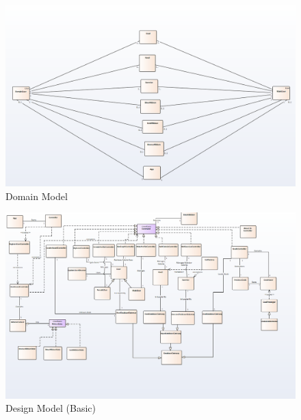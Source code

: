 \documentclass[10pt]{article}
\begin{document}
\begin{figure}[h!]
	\begin{center}
		\includegraphics[width=\columnwidth]{Domain.png}
		\caption{{Domain Model
				{\label{div-291050}}%
		}}
	\end{center}
\end{figure}


\begin{figure}[h!]
	\begin{center}
		\includegraphics[width=\columnwidth]{DesignBasic.png}
		\caption{{Design Model (Basic)
				{\label{div-291050}}%
		}}
	\end{center}
\end{figure}
\end{document}
